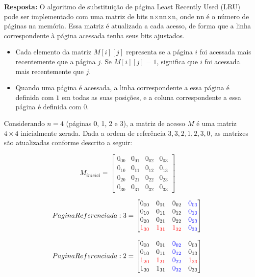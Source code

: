 \documentclass{article}
\begin{document}
\textbf{Resposta: }O algoritmo de substituição de página Least Recently Used (LRU) pode ser implementado com uma matriz de bits n×nn×n, onde nn é o número de páginas na memória. Essa matriz é atualizada a cada acesso, de forma que a linha correspondente à página acessada tenha seus bits ajustados.

\begin{itemize}
    \item Cada elemento da matriz $M[i][j]$ representa se a página $i$ foi acessada mais recentemente que a página $j$. Se $M[i][j]=1$, significa que $i$ foi acessada mais recentemente que $j$.
    \item Quando uma página é acessada, a linha correspondente a essa página é definida com $1$ em todas as suas posições, e a coluna correspondente a essa página é definida com $0$.
\end{itemize}

Considerando $n=4$ (páginas 0, 1, 2 e 3), a matriz de acesso $M$ é uma matriz $4×4$ inicialmente zerada. Dada a ordem de referência $3, 3, 2, 1, 2, 3, 0$, as matrizes são atualizadas conforme descrito a seguir:


\[M_{inicial} =
\begin{bmatrix}
  0_{00} & 0_{01} & 0_{02} & 0_{03}\\
  0_{10} & 0_{11} & 0_{12}    & 0_{13}\\
  0_{20} & 0_{21} & 0_{22}    & 0_{23}\\
  0_{30} & 0_{31} & 0_{32}    & 0_{33}
\end{bmatrix}
\]

\[PaginaReferenciada: 3 =
\begin{bmatrix}
  0_{00} & 0_{01} & 0_{02} & \textcolor{blue}{0_{03}}\\
  0_{10} & 0_{11} & 0_{12}    & \textcolor{blue}{0_{13}}\\
  0_{20} & 0_{21} & 0_{22}    & \textcolor{blue}{0_{23}}\\
  \textcolor{red}{1_{30}} & \textcolor{red}{1_{31}} & \textcolor{red}{1_{32}}    & \textcolor{blue}{0_{33}}
\end{bmatrix}
\]

\[
PaginaReferenciada: 2 =
\begin{bmatrix}
  0_{00} & 0_{01} & \textcolor{blue}{0_{02}} & 0_{03} \\
  0_{10} & 0_{11} & \textcolor{blue}{0_{12}} & 0_{13} \\
  \textcolor{red}{1_{20}} & \textcolor{red}{1_{21}} & \textcolor{blue}{0_{22}} & \textcolor{red}{1_{23}} \\
  1_{30} & 1_{31} & \textcolor{blue}{0_{32}} & 0_{33}
\end{bmatrix}
\]
\end{document}
